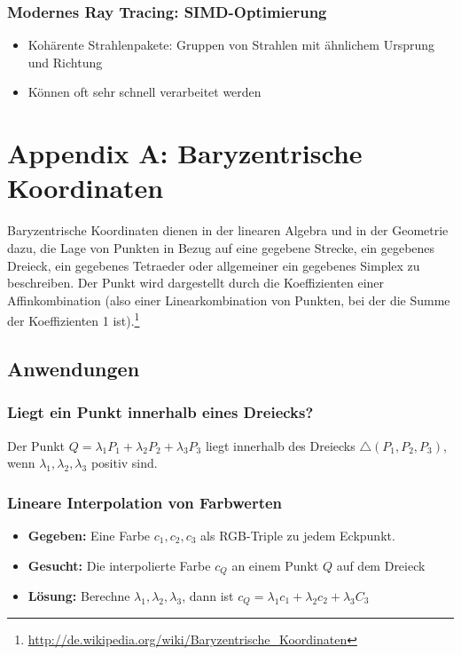 \subsubsection{Modernes Ray Tracing: SIMD-Optimierung}
\begin{itemize}
	\item Kohärente Strahlenpakete: Gruppen von Strahlen mit ähnlichem Ursprung und Richtung
	\item Können oft sehr schnell verarbeitet werden
\end{itemize}



\section{Appendix A: Baryzentrische Koordinaten}
Baryzentrische Koordinaten dienen in der linearen Algebra und in der Geometrie dazu, die Lage von Punkten in Bezug auf eine gegebene Strecke, ein gegebenes Dreieck, ein gegebenes Tetraeder oder allgemeiner ein gegebenes Simplex zu beschreiben. Der Punkt wird dargestellt durch die Koeffizienten einer Affinkombination (also einer Linearkombination von Punkten, bei der die Summe der Koeffizienten 1 ist).\footnote{\url{http://de.wikipedia.org/wiki/Baryzentrische_Koordinaten}}

\subsection{Anwendungen}

\subsubsection{Liegt ein Punkt innerhalb eines Dreiecks?}
Der Punkt \(Q = \lambda_1 P_1 + \lambda_2 P_2 + \lambda_3 P_3\) liegt innerhalb des Dreiecks \(\triangle(P_1,P_2,P_3)\), wenn \(\lambda_1,\lambda_2,\lambda_3\) positiv sind.

\subsubsection{Lineare Interpolation von Farbwerten}
\begin{itemize}
	\item \textbf{Gegeben:} Eine Farbe \(c_1,c_2,c_3\) als RGB-Triple zu jedem Eckpunkt.
	\item \textbf{Gesucht:} Die interpolierte Farbe \(c_Q\) an einem Punkt \(Q\) auf dem Dreieck
	\item \textbf{Lösung:} Berechne \(\lambda_1,\lambda_2,\lambda_3\), dann ist \(c_Q=\lambda_1 c_1+\lambda_2 c_2 + \lambda_3 C_3\)
\end{itemize}


